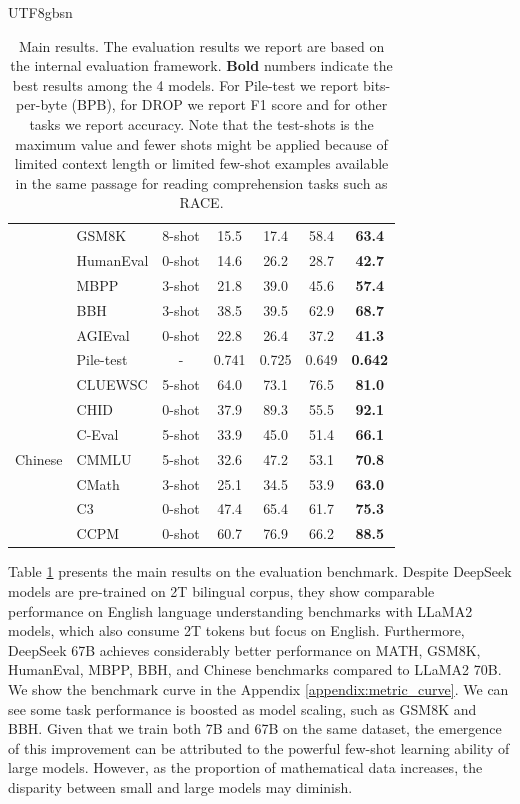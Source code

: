 \documentclass[11pt, a4paper, logo, copyright, nonumbering]{deepseek}
\begin{document}
\begin{CJK*}{UTF8}{gbsn}
\begin{table}[!t]
\begin{tabular}{clc|cccc}
&GSM8K & 8-shot & 15.5 & 17.4 & 58.4 & \textbf{63.4} \\
&HumanEval & 0-shot & 14.6 & 26.2 & 28.7 & \textbf{42.7} \\
&MBPP & 3-shot & 21.8 & 39.0 & 45.6 & \textbf{57.4} \\
&BBH & 3-shot & 38.5 & 39.5 & 62.9 & \textbf{68.7} \\
&AGIEval & 0-shot & 22.8 & 26.4 & 37.2 & \textbf{41.3} \\
&Pile-test  & - & 0.741 & 0.725 & 0.649 & \textbf{0.642} \\
\midrule
\multirow{7}{*}{Chinese} &CLUEWSC & 5-shot & 64.0 & 73.1 & 76.5 & \textbf{81.0} \\
&CHID  & 0-shot & 37.9 & 89.3 & 55.5 & \textbf{92.1} \\
&C-Eval & 5-shot & 33.9 & 45.0 & 51.4 & \textbf{66.1} \\
&CMMLU & 5-shot & 32.6 & 47.2 & 53.1 & \textbf{70.8} \\
&CMath & 3-shot & 25.1 & 34.5 & 53.9 & \textbf{63.0} \\
&C3 & 0-shot & 47.4 & 65.4 & 61.7 & \textbf{75.3} \\
&CCPM & 0-shot & 60.7 & 76.9 & 66.2 & \textbf{88.5} \\
\bottomrule
\end{tabular}
    \caption{Main results. The evaluation results we report are based on the internal evaluation framework. \textbf{Bold} numbers indicate the best results among the 4 models. For Pile-test we report bits-per-byte (BPB), for DROP we report F1 score and for other tasks we report accuracy. Note that the test-shots is the maximum value and fewer shots might be applied because of limited context length or limited few-shot examples available in the same passage for reading comprehension tasks such as RACE.}
    \label{tab:main_results}
\end{table}

Table \ref{tab:main_results} presents the main results on the evaluation benchmark. Despite DeepSeek models are pre-trained on 2T bilingual corpus, they show comparable performance on English language understanding benchmarks with LLaMA2 models, which also consume 2T tokens but focus on English. Furthermore, DeepSeek 67B achieves considerably better performance on MATH, GSM8K, HumanEval, MBPP, BBH, and Chinese benchmarks compared to LLaMA2 70B. We show the benchmark curve in the Appendix \ref{appendix:metric_curve}.  We can see some task performance is boosted as model scaling, such as GSM8K and BBH.  Given that we train both 7B and 67B on the same dataset, the emergence of this improvement can be attributed to the powerful few-shot learning ability of large models. However, as the proportion of mathematical data increases, the disparity between small and large models may diminish.


\end{CJK*}
\end{document}
